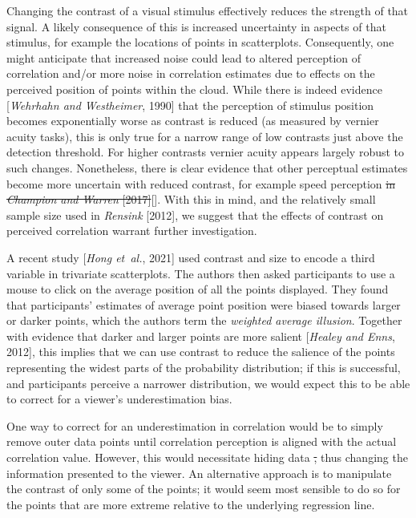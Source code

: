 \documentclass[preprint, 3p,
authoryear]{elsarticle} %
\newcommand{\ldiffentity}[1]{#1}
\providecommand{\DIFaddtex}[1]{{\protect\color{blue}\uwave{#1}}} %
\providecommand{\DIFdeltex}[1]{{\protect\color{red}\sout{#1}}}                      %
\providecommand{\DIFaddbegin}{} %
\providecommand{\DIFaddend}{} %
\providecommand{\DIFdelbegin}{} %
\providecommand{\DIFdelend}{} %
\providecommand{\DIFadd}[1]{\texorpdfstring{\DIFaddtex{#1}}{#1}} %
\providecommand{\DIFdel}[1]{\texorpdfstring{\DIFdeltex{#1}}{}} %
\newcommand{\DIFscaledelfig}{0.5}
\newlength{\DIFdelgraphicswidth} %
\newlength{\DIFdelgraphicsheight} %
\newcommand{\DIFaddincludegraphics}[2][]{{\color{blue}\fbox{\DIFOincludegraphics[#1]{#2}}}} %
\newcommand{\DIFdelincludegraphics}[2][]{%
\sbox{\DIFdelgraphicsbox}{\DIFOincludegraphics[#1]{#2}}%
\settoboxwidth{\DIFdelgraphicswidth}{\DIFdelgraphicsbox} %
\settoboxtotalheight{\DIFdelgraphicsheight}{\DIFdelgraphicsbox} %
\scalebox{\DIFscaledelfig}{%
\parbox[b]{\DIFdelgraphicswidth}{\usebox{\DIFdelgraphicsbox}\\[-\baselineskip] \rule{\DIFdelgraphicswidth}{0em}}\llap{\resizebox{\DIFdelgraphicswidth}{\DIFdelgraphicsheight}{%
\setlength{\unitlength}{\DIFdelgraphicswidth}%
\begin{picture}(1,1)%
\thicklines\linethickness{2pt} %
{\color[rgb]{1,0,0}\put(0,0){\framebox(1,1){}}}%
{\color[rgb]{1,0,0}\put(0,0){\line( 1,1){1}}}%
{\color[rgb]{1,0,0}\put(0,1){\line(1,-1){1}}}%
\end{picture}%
}\hspace*{3pt}}} %
} %
\DeclareRobustCommand{\DIFaddbegin}{\DIFOaddbegin \let\includegraphics\DIFaddincludegraphics} %
\DeclareRobustCommand{\DIFaddend}{\DIFOaddend \let\includegraphics\DIFOincludegraphics} %
\DeclareRobustCommand{\DIFdelbegin}{\DIFOdelbegin \let\includegraphics\DIFdelincludegraphics} %
\DeclareRobustCommand{\DIFdelend}{\DIFOaddend \let\includegraphics\DIFOincludegraphics} %
\begin{document}
Changing the contrast of a visual stimulus effectively reduces the
strength of that signal. A likely consequence of this is increased
uncertainty in aspects of that stimulus, for example the locations of
points in scatterplots. Consequently, one might anticipate that
increased noise could lead to altered perception of correlation and/or
more noise in correlation estimates due to effects on the perceived
position of points within the cloud. While there is indeed evidence
[\ldiffentity{\textit{Wehrhahn and Westheimer}, \ldiffentity{1990}}] that the perception of stimulus position becomes
exponentially worse as contrast is reduced (as measured by vernier
acuity tasks), this is only true for a narrow range of low contrasts
just above the detection threshold. For higher contrasts vernier acuity
appears largely robust to such changes. Nonetheless, there is clear
evidence that other perceptual estimates become more uncertain with
reduced contrast, for example speed perception \DIFdelbegin \DIFdel{in \ldiffentity{\textit{Champion and Warren} [\ldiffentity{2017}]}}\DIFdelend \DIFaddbegin [\DIFadd{\ldiffentity{\textit{Champion and Warren}, \ldiffentity{2017}}}]\DIFaddend .
With this in mind, and the relatively small sample size used in
\ldiffentity{\textit{Rensink} [\ldiffentity{2012}]}, we suggest that the effects of contrast on
perceived correlation warrant further investigation.

A recent study [\ldiffentity{\textit{Hong et~al.}, \ldiffentity{2021}}] used contrast and size to encode a
third variable in trivariate scatterplots. The authors then asked
participants to use a mouse to click on the average position of all the
points displayed. They found that participants' estimates of average
point position were biased towards larger or darker points, which the
authors term the \emph{weighted average illusion}. Together with
evidence that darker and larger points are more salient
[\ldiffentity{\textit{Healey and Enns}, \ldiffentity{2012}}], this implies that we can use contrast to reduce the
salience of the points representing the widest parts of the probability
distribution; if this is successful, and participants perceive a
narrower distribution, we would expect this to be able to correct for a
viewer's underestimation bias.

One way to correct for an underestimation in correlation would be to
simply remove outer data points until correlation perception is aligned
with the actual correlation value. However, this would necessitate
hiding data \DIFdelbegin \DIFdel{, }\DIFdelend \DIFaddbegin \DIFadd{and }\DIFaddend thus changing the information presented to the viewer.
An alternative approach is to manipulate the contrast of only some of
the points; it would seem most sensible to do so for the points that are
more extreme relative to the underlying regression line.
\end{document}
